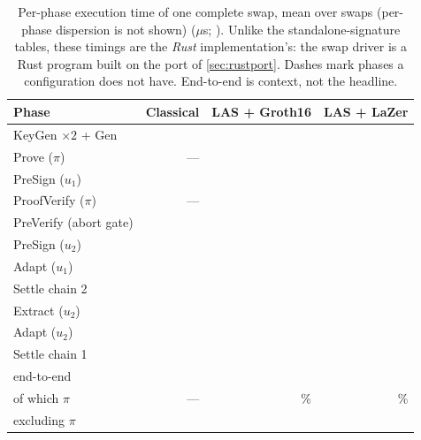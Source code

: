 \begin{table}[htbp]
  \centering
  \caption[Per-phase execution time of the swap]{Per-phase execution time of one
  complete swap, mean over \stageTwoRuns{} swaps (per-phase dispersion is not shown)
  ($\mu$s; \stageTwoCpu{}). Unlike the standalone-signature tables, these timings are the
  \emph{Rust} implementation's: the swap driver is a Rust program built on the port of
  \cref{sec:rustport}. Dashes mark phases a
  configuration does not have. End-to-end is context, not the headline.}
  \label{tab:stage2-time}
  \small
  \begin{tabular}{@{}l r r r@{}}
    \toprule
    Phase & Classical & LAS + Groth16 & LAS + LaZer \\
    \midrule
    KeyGen $\times2$ + Gen & \cfgOneKeyMatMean{} & \cfgTwoKeyMatMean{} & \cfgThreeKeyMatMean{} \\
    Prove ($\pi$)          & ---                 & \cfgTwoProveMean{}  & \cfgThreeProveMean{} \\
    PreSign ($u_1$)        & \cfgOnePreSignAMean{} & \cfgTwoPreSignAMean{} & \cfgThreePreSignAMean{} \\
    ProofVerify ($\pi$)    & ---                 & \cfgTwoProofVerifyMean{} & \cfgThreeProofVerifyMean{} \\
    PreVerify (abort gate) & \cfgOnePreVerifyMean{} & \cfgTwoPreVerifyMean{} & \cfgThreePreVerifyMean{} \\
    PreSign ($u_2$)        & \cfgOnePreSignBMean{} & \cfgTwoPreSignBMean{} & \cfgThreePreSignBMean{} \\
    Adapt ($u_1$)          & \cfgOneAdaptAMean{} & \cfgTwoAdaptAMean{} & \cfgThreeAdaptAMean{} \\
    Settle chain 2         & \cfgOneSettleBMean{} & \cfgTwoSettleBMean{} & \cfgThreeSettleBMean{} \\
    Extract ($u_2$)        & \cfgOneExtMean{} & \cfgTwoExtMean{} & \cfgThreeExtMean{} \\
    Adapt ($u_2$)          & \cfgOneAdaptBMean{} & \cfgTwoAdaptBMean{} & \cfgThreeAdaptBMean{} \\
    Settle chain 1         & \cfgOneSettleAMean{} & \cfgTwoSettleAMean{} & \cfgThreeSettleAMean{} \\
    \midrule
    end-to-end             & \cfgOneTotalMean{} & \cfgTwoTotalMean{} & \cfgThreeTotalMean{} \\
    \quad of which $\pi$   & ---                & \cfgTwoProofPct{}\% & \cfgThreeProofPct{}\% \\
    \quad excluding $\pi$  & \cfgOneNonProofUs{} & \cfgTwoNonProofUs{} & \cfgThreeNonProofUs{} \\
    \bottomrule
  \end{tabular}
\end{table}

